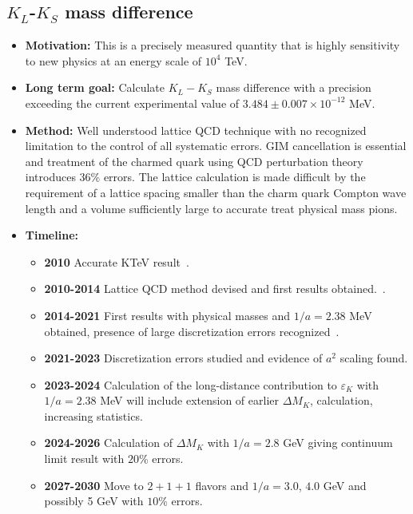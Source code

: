 \documentclass[12pt,hyperpdf]{article}
\begin{document}
\subsection{$K_L$-$K_S$ mass difference}
\begin{itemize}
    \item{\bf Motivation:} This is a precisely measured quantity that is highly sensitivity to new physics 
    at an energy scale of $10^4$ TeV.
    \item{\bf Long term goal:} Calculate $K_L - K_S$ mass difference with
    a precision exceeding the current experimental value of $3.484
    \pm 0.007 \times  10^{-12}$ MeV.
    \item{\bf Method:} Well understood lattice QCD technique with no
    recognized limitation to the control of all systematic
    errors. GIM cancellation is essential and treatment of the
    charmed quark using QCD perturbation theory introduces 36\%
    errors. The lattice calculation is made diﬀicult by the
    requirement of a lattice spacing smaller than the charm quark
    Compton wave length and a volume suﬀiciently large to accurate
    treat physical mass pions. 
\item{\bf Timeline:}
\begin{itemize}
    \item{\bf 2010} Accurate KTeV result~\cite{KTeV:2010sng}.
    \item{\bf 2010-2014} Lattice QCD method devised and first results 
    obtained.~\cite{Christ:2012se, Bai:2014cva}.
    \item{\bf 2014-2021} First results with physical masses and $1/a = 2.38$ MeV 
    obtained, presence of large discretization errors recognized~\cite{Bai:2018lrm, 
    Wang:2021twm}.
    \item{\bf 2021-2023} Discretization errors studied and evidence of $a^2$ scaling 
    found.
    \item{\bf 2023-2024} Calculation of the long-distance contribution to
    $\varepsilon_K$ with $1/a = 2.38$ MeV will include extension of
    earlier $\Delta M_K$, calculation, increasing statistics.
    \item{\bf 2024-2026} Calculation of $\Delta M_K$ with $1/a = 2.8$ GeV
    giving continuum limit result with $20$\% errors. 
    \item{\bf 2027-2030} Move to $2+1+1$ flavors and $1/a = 3.0$, $4.0$
    GeV and possibly 5 GeV with $10$\% errors. 
\end{itemize}
\end{itemize}
\end{document}
